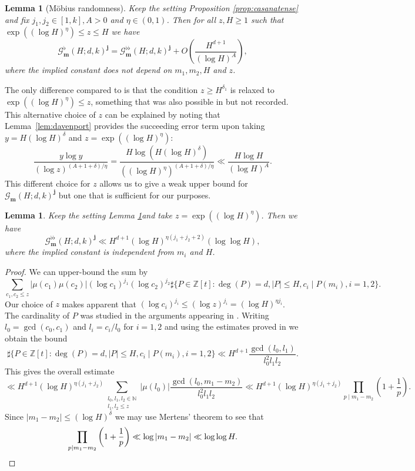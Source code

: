 \documentclass[reqno, 11pt]{amsart}
\numberwithin{equation}{section}
\newtheorem{lemma}[theorem]{Lemma}
\theoremstyle{definition}
\newcommand{\0}{\mathbf{0}}
\renewcommand{\leq}{\leqslant}
\renewcommand{\geq}{\geqslant}
\renewcommand{\b}{\mathbf{b}}
\renewcommand{\b}{\mathbf}
\renewcommand{\leq}{\leqslant}
\renewcommand{\geq}{\geqslant}
\renewcommand{\#}{\sharp}
\begin{document}
\begin{lemma}[M\"obius randomness]\label{lemma:eurovision} Keep the setting 
Proposition \ref{prop:casanatense} and fix $j_1,j_2\in [1,k],A>0$ and $\eta\in (0,1)$. Then for all $z, H \geq 1$ such that 
 $\exp((\log H)^\eta) \leq z \leq  H$  we have  \[\mathcal G^\flat_{\b m}(H;d,k)^{\b j}=
\mathcal G^{\flat\flat}_{\b m}(H;d,k)^{\b j}+ O \left( \frac{H^{d+1}}{(\log H)^A} \right),
\] where  the implied constant does not depend  on $m_1, m_2, H$ and $z$. \end{lemma} 
The only   difference compared to  \cite[Proposition 3.8]{MR4542704} is that the condition $z\geq H^{\delta_1}$
is relaxed to $\exp((\log H)^\eta) \leq z $, something that was also   possible 
in  \cite{MR4542704} but   not recorded. This alternative choice of $z$  can be explained by  noting that 
Lemma~\ref{lem:davenport} provides  the succeeding error term upon taking   $y=H (\log H)^{\delta}$ and 
$z=\exp((\log H)^\eta)$: $$  \frac{y \log y }{ (\log z)^{(A+1+\delta)/\eta} }
=  \frac{H  \log (H (\log H)^\delta) } {( (\log H)^{\eta})^{(A+1+\delta)/\eta} }
\ll  \frac{H  \log H }{ (\log H)^A }. $$ This different choice for $z$  allows us to  give a weak
upper bound for $\mathcal G_{\b m}(H;d,k)^{\b j}$ but one that  is sufficient for our purposes.
\begin{lemma} \label{lemma:eurovision234} Keep the setting Lemma \ref{lemma:eurovision}and take  $z=\exp((\log H)^\eta)$. Then 
we have  \[ \mathcal G^{\flat\flat}_{\b m}(H;d,k)^{\mathbf j} \ll H^{d+1}  (\log H )^{\eta( j_1+j_2+2)}(\log \log H),\]where the implied constant is independent  from  $m_i$ and $H$. \end{lemma}  \begin{proof} We can upper-bound the sum by  $$\sum_{c_1,c_2 \leq z}
|\mu(c_1)\mu(c_2)| (\log c_1)^{j_1}(\log c_2)^{j_2} \#\{  P\in \mathbb Z[t]:  \deg(P)=d, |P|\leq H,   c_i \mid P(m_i), i=1,2  \}
.$$ Our choice of $z$ makes apparent that   $ (\log c_i)^{j_i} \leq(\log z)^{j_i} =(\log H)^{\eta j_i}$. The cardinality of $P$ was studied in the arguments  appearing in \cite[Equation (3.4)]{MR4542704}. Writing $l_0= \gcd(c_0,c_1)$ and $l_i=c_i/l_0 $ for $i=1,2$  and using the estimates proved in  \cite[pages 697-698]{MR4542704}  we obtain the  bound$$\#\{  P\in \mathbb Z[t]:  \deg(P)=d,
|P|\leq H,   c_i \mid P(m_i), i=1,2  \} \ll  H^{d+1}  \frac{\gcd(l_0,l_1)}{l_0^2 l_1 l_2 }.$$ This gives the overall estimate  
$$\ll H^{d+1} (\log H)^{\eta (j_1+j_2)} \sum_{\substack{ l_0,l_1,l_2 \in \mathbb N \\  l_1,l_2 \leq z}}
|\mu(l_0 )|  \frac{\gcd(l_0,m_1-m_2)  }{l_0^2 l_1 l_2 }   \ll H^{d+1}  (\log H)^{\eta (j_1+j_2)} \prod_{p\mid m_1-m_2}
\left(1+\frac{1}{p}\right) .$$ Since $|m_1-m_2| \leq (\log H)^\delta$ we may use Mertens' theorem to see that\[ \prod_{p\mid m_1-m_2}
\left(1+\frac{1}{p}\right) \ll \log |m_1-m_2| \ll \log \log H.\qedhere\] \end{proof}
\end{document}
